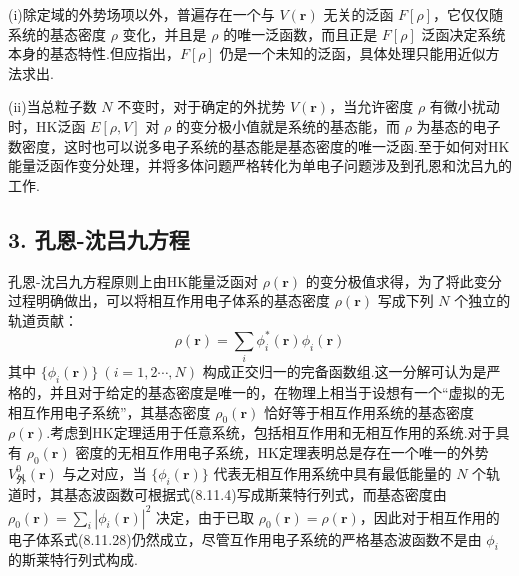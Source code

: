 (i)除定域的外势场项以外，普遍存在一个与 $V(\boldsymbol{r})$ 无关的泛函 $F[\rho]$，它仅仅随系统的基态密度 $\rho$ 变化，并且是 $\rho$ 的唯一泛函数，而且正是 $F[\rho]$ 泛函决定系统本身的基态特性.但应指出，$F[\rho]$ 仍是一个未知的泛函，具体处理只能用近似方法求出.

(ii)当总粒子数 $N$ 不变时，对于确定的外扰势 $V(\boldsymbol{r})$，当允许密度 $\rho$ 有微小扰动时，HK泛函 $E[\rho,V]$ 对 $\rho$ 的变分极小值就是系统的基态能，而 $\rho$ 为基态的电子数密度，这时也可以说多电子系统的基态能是基态密度的唯一泛函.至于如何对HK能量泛函作变分处理，并将多体问题严格转化为单电子问题涉及到孔恩和沈吕九的工作.
\subsection*{3. 孔恩-沈吕九方程}

孔恩-沈吕九方程原则上由HK能量泛函对 $\rho(\boldsymbol{r})$ 的变分极值求得，为了将此变分过程明确做出，可以将相互作用电子体系的基态密度 $\rho(\boldsymbol{r})$ 写成下列 $N$ 个独立的轨道贡献：
\begin{equation}
  \rho(\boldsymbol{r})=\sum_{i}\phi_{i}^{*}(\boldsymbol{r})\phi_{i}(\boldsymbol{r})
\end{equation}
其中 $\{\phi_{i}(\boldsymbol{r})\}\ (i=1,2\cdots,N)$ 构成正交归一的完备函数组.这一分解可认为是严格的，并且对于给定的基态密度是唯一的，在物理上相当于设想有一个“虚拟的无相互作用电子系统”，其基态密度 $\rho_{0}(\boldsymbol{r})$ 恰好等于相互作用系统的基态密度 $\rho(\boldsymbol{r})$.考虑到HK定理适用于任意系统，包括相互作用和无相互作用的系统.对于具有 $\rho_{0}(\boldsymbol{r})$ 密度的无相互作用电子系统，HK定理表明总是存在一个唯一的外势 $V_{\text{外}}^{0}(\boldsymbol{r})$ 与之对应，当 $\{\phi_{i}(\boldsymbol{r})\}$ 代表无相互作用系统中具有最低能量的 $N$ 个轨道时，其基态波函数可根据式(8.11.4)写成斯莱特行列式，而基态密度由 $\rho_{0}(\boldsymbol{r})=\sum_{i}|\phi_{i}(\boldsymbol{r})|^{2}$ 决定，由于已取 $\rho_{0}(\boldsymbol{r})=\rho(\boldsymbol{r})$，因此对于相互作用的电子体系式(8.11.28)仍然成立，尽管互作用电子系统的严格基态波函数不是由 $\phi_{i}$ 的斯莱特行列式构成.


